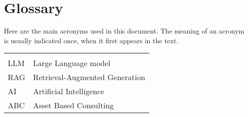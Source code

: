 \chapter*{Glossary}

Here are the main acronyms used in this document. The meaning of an acronym is usually indicated once, when it first appears in the text.

\begin{longtable}{lp{9cm}}
        &                                \\
    LLM & Large Language model           \\
    RAG & Retrieval-Augmented Generation \\
    AI  & Artificial Intelligence        \\
    ABC & Asset Based Consulting         \\
\end{longtable}
